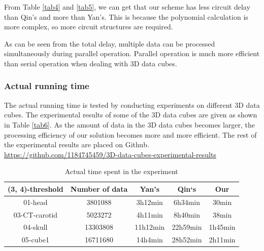 From Table \ref{tab4} and \ref{tab5}, we can get that our scheme has less circuit delay than Qin's and more than Yan's. This is because the polynomial calculation is more complex, so more circuit structures are required.

As can be seen from the total delay, multiple data can be processed simultaneously during parallel operation. Parallel operation is much more efficient than serial operation when dealing with 3D data cubes.

\subsubsection{Actual running time}\label{subsec532}

The actual running time is tested by conducting experiments on different 3D data cubes. The experimental results of some of the 3D data cubes are given as shown in Table \ref{tab6}. As the amount of data in the 3D data cubes becomes larger, the processing efficiency of our solution becomes more and more efficient. The rest of the experimental results are placed on Github.
\url{https://github.com/1184745459/3D-data-cubes-experimental-results} 

\begin{table}[!htb]
\begin{center}
	\caption{Actual time spent in the experiment}\label{tab6}
	\label{11111}    
	\begin{tabular}{ccccc}
		\toprule
		(3, 4)-threshold&Number of data&Yan’s\cite{xing2022information}&Qin‘s\cite{qin2021reversible}&Our\\
		\midrule
		01-head&3801088&3h12min&6h34min&30min\\
		03-CT-carotid&5023272&4h11min&8h40min&38min\\
		04-skull&13303808&11h12min&22h59min&1h45min\\
		05-cube1&16711680&14h4min&28h52min&2h11min\\
		\bottomrule
	\end{tabular}
	\end{center}
\end{table}

